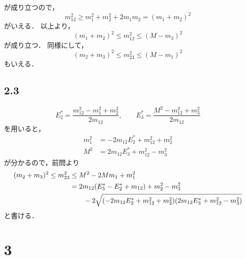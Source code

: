 が成り立つので，
\begin{equation}
  m_{12}^2 \ge m_1^2 + m_2^2 + 2m_1m_2 = \left(m_1 + m_2\right)^2
\end{equation}
がいえる．
以上より，
\begin{equation}
  \left(m_1 + m_2\right)^2\le m_{12}^2 \le \left(M - m_3\right)^2 
\end{equation}
が成り立つ．
同様にして，
\begin{equation}
  \left(m_2 + m_3\right)^2\le m_{23}^2 \le \left(M - m_1\right)^2 
\end{equation}
もいえる．

\subsection*{2.3}
\begin{equation}
  E_2^* = \frac{m_{12}^2 - m_1^2 + m_2^2}{2m_{12}},\qquad E_3^* = \frac{M^2 - m_{12}^2 + m_3^2}{2m_{12}}
\end{equation}
を用いると，
\begin{align}
  m_1^2 &= -2m_{12}E_2^* + m_{12}^2 + m_2^2 \\
  M^2 &= 2m_{12} E_3^* + m_{12}^2 - m_3^2
\end{align}
が分かるので，前問より
\begin{align}
  (m_2+m_3)^2 \le m_{23}^2 &\le M^2 - 2Mm_1 + m_1^2 \notag\\
  &= 2m_{12}(E_3^*-E_2^*+m_{12}) + m_2^2 - m_3^2 \notag\\
  &\qquad - 2\sqrt{(-2m_{12}E_2^* + m_{12}^2 + m_2^2)(2m_{12} E_3^* + m_{12}^2 - m_3^2)}
\end{align}
と書ける．

\section*{3}
